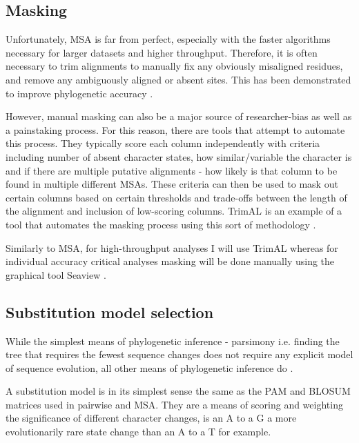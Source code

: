 \subsection{Masking}

Unfortunately, MSA is far from perfect, especially with the faster algorithms 
necessary for larger datasets and higher throughput.  Therefore,
it is often necessary to trim alignments to manually fix any obviously 
misaligned residues, and remove any ambiguously aligned or absent sites.
This has been demonstrated to improve phylogenetic accuracy \citep{Talavera2007}.


However, manual masking can also be a major source of researcher-bias as well
as a painstaking process.  For this reason, there are tools that attempt to 
automate this process.   They typically score each column independently with
criteria including number of absent character states, how similar/variable the
character is and if there are multiple putative alignments - how likely is
that column to be found in multiple different MSAs.
These criteria can then be used to mask out certain columns based on certain
thresholds and trade-offs between the length of the alignment and inclusion
of low-scoring columns.  
TrimAL is an example of a tool that automates the masking process
using this sort of methodology \citep{Capella-Gutierrez2009}.  

Similarly to MSA, for high-throughput analyses I will use TrimAL 
whereas for individual accuracy critical analyses masking will be done
manually using the graphical tool Seaview \citep{Gouy2010}.




\subsection{Substitution model selection}

While the simplest means of phylogenetic inference - parsimony i.e. finding
the tree that requires the fewest sequence changes does not require any explicit
model of sequence evolution, all other means of phylogenetic inference do \citep{Le2008}.


A substitution model is in its simplest sense the same as the PAM and BLOSUM
matrices used in pairwise and MSA.  They are a means of scoring and weighting
the significance of different character changes, is an A to a G a more evolutionarily
rare state change than an A to a T for example.


